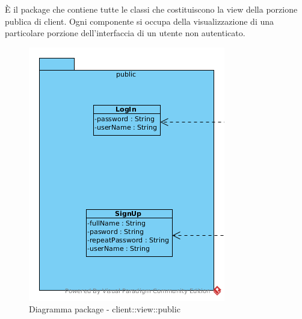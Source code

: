 È il package che contiene tutte le classi che costituiscono la view della porzione publica di client. Ogni componente si occupa della visualizzazione di una particolare porzione dell'interfaccia di un utente non autenticato.\begin{center}
		\begin{figure}[H]
			\centering \includegraphics[scale=4, max width=\textwidth, max height=\myheight]{../img/diagrammiClassi/client/view/public.png}
			\caption{Diagramma package - client::view::public}
		\end{figure}
	\end{center}\hypertarget{client::view::public::LogIn}{}

